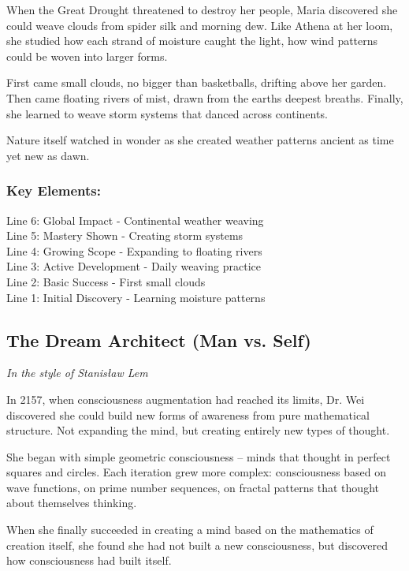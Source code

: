 \documentclass[
]{article}
\begin{document}
When the Great Drought threatened to destroy her people, Maria
discovered she could weave clouds from spider silk and morning dew. Like
Athena at her loom, she studied how each strand of moisture caught the
light, how wind patterns could be woven into larger forms.

First came small clouds, no bigger than basketballs, drifting above her
garden. Then came floating rivers of mist, drawn from the
earth\textquotesingle s deepest breaths. Finally, she learned to weave
storm systems that danced across continents.

Nature itself watched in wonder as she created weather patterns ancient
as time yet new as dawn.

\subsubsection{Key Elements:}\label{key-elements-2}

Line 6: Global Impact - Continental weather weaving\\
Line 5: Mastery Shown - Creating storm systems\\
Line 4: Growing Scope - Expanding to floating rivers\\
Line 3: Active Development - Daily weaving practice\\
Line 2: Basic Success - First small clouds\\
Line 1: Initial Discovery - Learning moisture patterns

\subsection{The Dream Architect (Man vs.
Self)}\label{the-dream-architect-man-vs-self}

\emph{In the style of Stanisław Lem}

In 2157, when consciousness augmentation had reached its limits, Dr. Wei
discovered she could build new forms of awareness from pure mathematical
structure. Not expanding the mind, but creating entirely new types of
thought.

She began with simple geometric consciousness -- minds that thought in
perfect squares and circles. Each iteration grew more complex:
consciousness based on wave functions, on prime number sequences, on
fractal patterns that thought about themselves thinking.

When she finally succeeded in creating a mind based on the mathematics
of creation itself, she found she had not built a new consciousness, but
discovered how consciousness had built itself.
\end{document}
